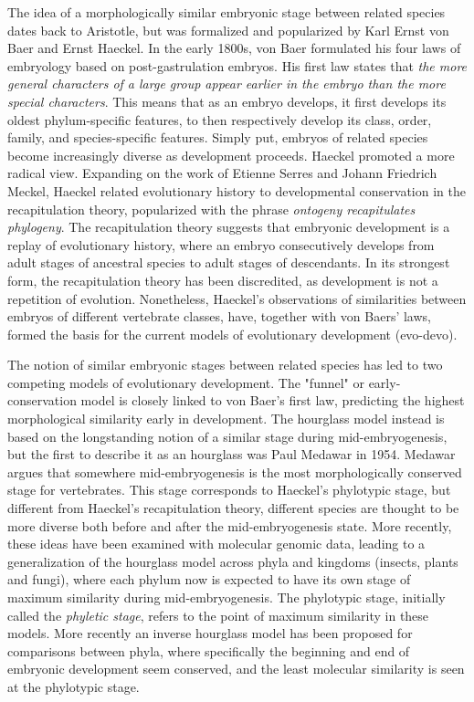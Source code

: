 The idea of a morphologically similar embryonic stage between related species dates back to Aristotle\cite{Aristotle1943}, but was formalized and popularized by Karl Ernst von Baer and Ernst Haeckel\cite{haeckel1866,baer1828}. In the early 1800s, von Baer formulated his four laws of embryology based on post-gastrulation embryos. His first law states that \textit{the more general characters of a large group appear earlier in the embryo than the more special characters}. This means that as an embryo develops, it first develops its oldest phylum-specific features, to then respectively develop its class, order, family, and species-specific features. Simply put, embryos of related species become increasingly diverse as development proceeds. Haeckel promoted a more radical view. Expanding on the work of Etienne Serres and Johann Friedrich Meckel, Haeckel related evolutionary history to developmental conservation in the recapitulation theory, popularized with the phrase \textit{ontogeny recapitulates phylogeny}. The recapitulation theory suggests that embryonic development is a replay of evolutionary history, where an embryo consecutively develops from adult stages of ancestral species to adult stages of descendants. In its strongest form, the recapitulation theory has been discredited, as development is not a repetition of evolution\cite{ehrlich1974}. Nonetheless, Haeckel's observations of similarities between embryos of different vertebrate classes, have, together with von Baers’ laws, formed the basis for the current models of evolutionary development (evo-devo).

The notion of similar embryonic stages between related species has led to two competing models of evolutionary development. The "funnel" or early-conservation model is closely linked to von Baer's first law, predicting the highest morphological similarity early in development. The hourglass model instead is based on the longstanding notion of a similar stage during mid-embryogenesis\cite{His1875}, but the first to describe it as an hourglass was Paul Medawar in 1954\cite{Medawar1954}. Medawar argues that somewhere mid-embryogenesis is the most morphologically conserved stage for vertebrates. This stage corresponds to Haeckel's phylotypic stage, but different from Haeckel's recapitulation theory, different species are thought to be more diverse both before and after the mid-embryogenesis state. More recently, these ideas have been examined with molecular genomic data, leading to a generalization of the hourglass model across phyla and kingdoms (insects\cite{Kalinka2010}, plants\cite{Quint2012} and fungi\cite{Cheng2015}), where each phylum now is expected to have its own stage of maximum similarity during mid-embryogenesis. The phylotypic stage, initially called the \textit{phyletic stage}, refers to the point of maximum similarity in these models\cite{Cohen1963, Seidel1960}. More recently an inverse hourglass model has been proposed for comparisons between phyla, where specifically the beginning and end of embryonic development seem conserved, and the least molecular similarity is seen at the phylotypic stage\cite{Levin2016}.

